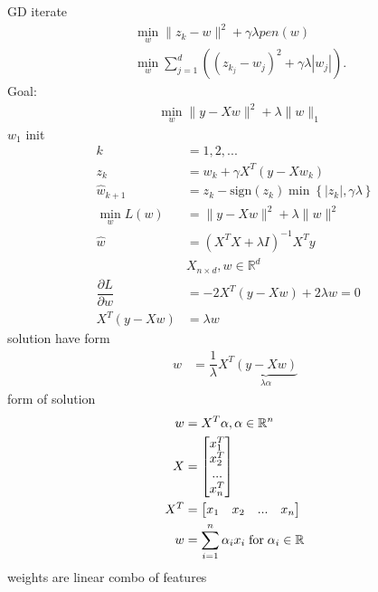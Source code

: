 \documentclass{article}
\begin{document}
GD iterate
\begin{align*}
&\displaystyle\min_{w} \| z_{k} - w \|^{2} + \gamma \lambda pen\left(w \right)
\\ &\displaystyle\min_{w} \displaystyle\sum_{j=1}^{d} \left(\left(z_{k_{j}} - w_{j}\right)^{2} + \gamma \lambda | w_{j} |\right).
\end{align*}
Goal:
\begin{align*}
&\displaystyle\min_{w} \| y - X w \|^{2} + \lambda \| w \|_{1}
\end{align*}
$w_{1}$ init
\begin{align*}
k  &= 1, 2, ...
\\ z_{k} &= w_{k} + \gamma X^{T} \left(y - X w_{k}\right)
\\ \hat{w}_{k+1} &= z_{k} - \text{sign}\left(z_{k}\right) \displaystyle\min\left\{| z_{k} |, \gamma \lambda\right\}
\\ \displaystyle\min_{w} L\left(w\right) &= \| y - X w \|^{2} + \lambda \| w \|^{2}
\\ \hat{w} &= \left(X^{T} X + \lambda I\right)^{-1} X^{T} y 
\\ &X_{n \times d}, w \in \mathbb{R}^{d}
\\ \dfrac{\partial L }{\partial w} &= - 2 X^{T} \left(y - X w\right) + 2 \lambda w = 0
\\ X^{T} \left(y - X w\right) &= \lambda w 
\end{align*}
solution have form
\begin{align*}
w  &= \dfrac{1}{\lambda} X^{T} \underbrace{\left(y - X w\right)}_{\lambda \alpha}
\end{align*}
form of solution
\begin{align*}
w  &= X^{T} \alpha, \alpha \in \mathbb{R}^{n}
\\ X  &= \begin{bmatrix} x_{1}^{T} \\ x_{2}^{T} \\ ... \\ x_{n}^{T} \end{bmatrix}
\\ X^{T} &= \begin{bmatrix} x_{1} & x_{2} & ... & x_{n} \end{bmatrix}
\\ w  &= \displaystyle\sum_{i=1}^{n} \alpha_{i} x_{i} \text{\;for\;} \alpha_{i} \in \mathbb{R}
\end{align*}
weights are linear combo of features
\end{document}

